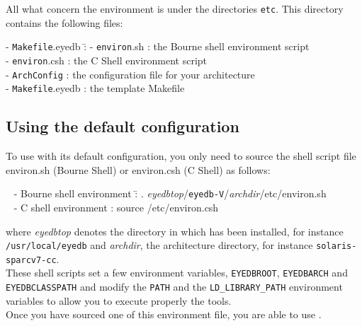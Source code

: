 All what concern the environment is under the directories \texttt{etc}.
This directory {\EYEDBARCH} contains the following
files:
\begin{tabbing}
- \texttt{Makefile}.eyedb \= : \kill
- \texttt{environ}.sh \> : the Bourne shell environment script \\
- \texttt{environ}.csh \> : the C Shell environment script \\
- \texttt{ArchConfig} \> : the configuration file for your architecture \\
- \texttt{Makefile}.eyedb \> : the template Makefile \\
\end{tabbing}
\subsection{Using the default configuration}
To use \eyedb with its default configuration, you only need to source
the shell script file environ.sh (Bourne Shell) or environ.csh (C Shell)
as follows:
\begin{tabbing}
\mbox{ } - Bourne shell environment \= : {\LARGE .} \emph{eyedbtop}/\texttt{eyedb-V\eyedbversion}/\emph{archdir}/etc/environ.sh \\
\mbox{ } - C shell environment \> : source {\EYEDBARCH}/etc/environ.csh
\end{tabbing}
where \emph{eyedbtop} denotes the directory in which \eyedb has been installed, for instance \texttt{/usr/local/eyedb} and \emph{archdir}, the architecture
directory, for instance \texttt{solaris-sparcv7-cc}.
\\
These shell scripts set a few environment variables, \texttt{EYEDBROOT},
\texttt{EYEDBARCH} and \texttt{EYEDBCLASSPATH} and modify the \texttt{PATH} 
and the \texttt{LD\_LIBRARY\_PATH} environment variables to allow you to execute properly the \eyedb
tools.
\\
Once you have sourced one of this environment file, you are able to use
\eyedbX.
